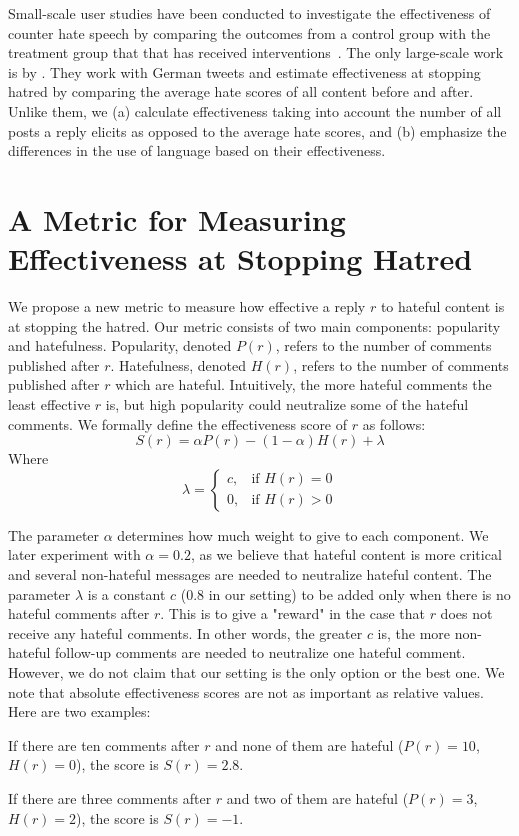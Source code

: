 \documentclass[11pt]{article}
\begin{document}
Small-scale user studies have been conducted to investigate the effectiveness of counter hate speech by comparing the outcomes from a control group with the treatment group that that has received interventions~\cite{munger2017tweetment,hangartner2021empathy,bilewicz2021artificial}. 
The only large-scale work is by \citet{garland2022impact}.
They work with German tweets and estimate effectiveness at stopping hatred by comparing the 
average hate scores of all content before and after.
Unlike them, 
we 
(a) calculate effectiveness taking into account the number of all posts a reply elicits as opposed to the average hate scores, 
and 
(b) emphasize the differences in the use of language based on their effectiveness.


\section{A Metric for Measuring Effectiveness at Stopping Hatred} %
\label{s:metric}
We propose a new metric to measure how effective a reply $r$ to hateful content is at stopping the hatred.
Our metric consists of two main components: popularity and hatefulness.
Popularity, denoted $P(r)$, refers to the number of comments published after $r$.
Hatefulness, denoted $H(r)$, refers to the number of comments published after $r$ which are hateful.
Intuitively, the more hateful comments the least effective $r$ is,
but high popularity could neutralize some of the hateful comments.
We formally define the effectiveness score of $r$ as follows:
$$S(r) = \alpha P(r) - (1-\alpha) H(r) + \lambda$$
Where
\[
\lambda =
\begin{cases}
	c, & \text{if } H(r) = 0\\
	0,              & \text{if } H(r) > 0
\end{cases}
\]

The parameter $\alpha$ determines how much weight to give to each component.
We later experiment with $\alpha = 0.2$, as we believe that hateful content is more critical and several non-hateful messages are needed to neutralize hateful content.
The parameter $\lambda$ is a constant $c$ (0.8 in our setting) to be added only when there is no hateful comments after $r$.
This is to give a "reward" in the case that $r$ does not receive any hateful comments. 
In other words, the greater $c$ is, the more non-hateful follow-up comments are needed to neutralize one hateful comment.
However, we do not claim that our setting is the only option or the best one. 
We note that absolute effectiveness scores are not as important as relative values.
Here are two examples:
\begin{compactitem}
	\item If there are ten comments after $r$ and none of them are hateful ($P(r)=10$, $H(r)=0$), the score is $S(r)=2.8$.
	\item If there are three comments after $r$ and two of them are hateful ($P(r)=3$, $H(r)=2$), the score is $S(r)=-1$.
\end{compactitem}
\end{document}
